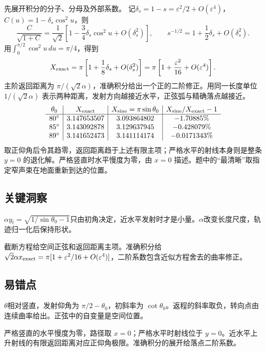 \documentclass[UTF8,fontset=fandol,a4paper,11pt]{ctexart}
\begin{document}
先展开积分的分子、分母及外部系数。
记$\delta_s=1-s=\varepsilon^2/2+O(\varepsilon^4)$，
$C(u)=1-\delta_s\cos^2u$，则
\[
\frac{C}{\sqrt{1+C}}=\frac1{\sqrt2}
\left[1-\frac34\delta_s\cos^2u+O(\delta_s^2)\right],
\qquad s^{-1/2}=1+\frac12\delta_s+O(\delta_s^2).
\]
用$\int_0^{\pi/2}\cos^2u\,du=\pi/4$，得到
\[
X_{\rm exact}=\pi\left[1+\frac18\delta_s+O(\delta_s^2)\right]
=\pi\left[1+\frac{\varepsilon^2}{16}+O(\varepsilon^4)\right].
\]
主阶返回距离为 $\pi/(\sqrt2\alpha)$，准确积分给出一个正的二阶修正。用同一长度单位 $1/(\sqrt2\alpha)$ 表示两种距离，发射方向越接近水平，正弦弧与精确落点越接近。
\[
\begin{array}{c|c|c|c}
\theta_0&X_{\rm exact}&X_{\rm sine}=\pi\sin\theta_0
&X_{\rm sine}/X_{\rm exact}-1\\ \hline
80^\circ&3.147653507&3.093864802&-1.70885\%\\
85^\circ&3.143092878&3.129637945&-0.428079\%\\
89^\circ&3.141652473&3.141114174&-0.0171343\%
\end{array}
\]
取正仰角后令其趋零，返回距离趋于上述有限主项；严格水平的射线本身则是整条 $y=0$ 的退化解。严格竖直时水平慢度为零，由 $x=0$ 描述。题中的“最清晰”取指定窄声束在地面重新到达的位置。




\subsection*{关键洞察}

$\alpha y_t=\sqrt{1/\sin\theta_0-1}$只由初角决定，近水平发射时才是小量。$\alpha$改变长度尺度，轨迹归一化后保持形状。

截断方程给空间正弦和返回距离主项。准确积分给 $\sqrt2\alpha x_{\rm exact}=\pi[1+\varepsilon^2/16+O(\varepsilon^4)]$，二阶系数包含近似方程舍去的曲率修正。




\subsection*{易错点}

$\theta$相对竖直，发射仰角为 $\pi/2-\theta_0$，初斜率为 $\cot\theta_0$。返程的斜率取负，转向点由连续曲率给出。正弦中的自变量是空间位置。

严格竖直的水平慢度为零，路径取 $x=0$；严格水平时射线位于 $y=0$。近水平上升射线的有限返回距离对应正仰角极限。准确积分的展开给落点二阶系数。
\end{document}
